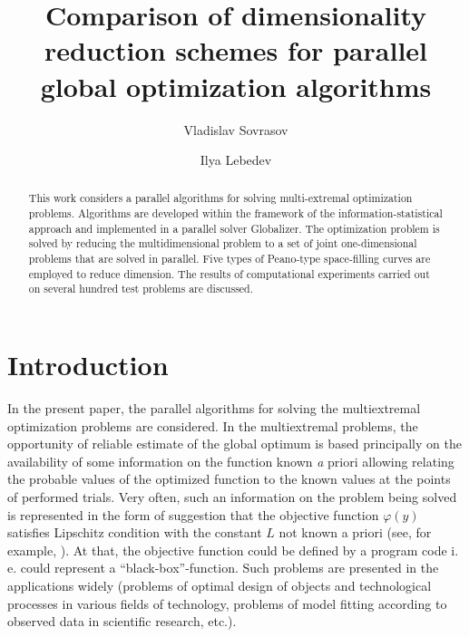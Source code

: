 \documentclass[procedia]{easychair}
\title{Comparison of dimensionality reduction schemes for parallel global optimization
algorithms}
\author {
Vladislav Sovrasov \and
Ilya Lebedev
}
\institute  {
  Lobachevsky State University of Nizhni Novgorod, Nizhni Novgorod, Russia
  \email{sovrasov.vlad@gmail.com}\\
  \email{ilya.lebedev@itmm.unn.ru}\\
}
\begin{document}
\maketitle


\begin{abstract}
This work considers a parallel algorithms for solving multi-extremal optimization problems.
Algorithms are developed within the framework of the information-statistical approach and
implemented in a parallel solver Globalizer. The optimization problem is solved by reducing
the multidimensional problem to a set of joint one-dimensional problems that are solved in
parallel. Five types of Peano-type space-filling curves are employed to reduce dimension. The
results of computational experiments carried out on several hundred test problems are discussed.
\end{abstract}



%
%


\section{Introduction}
\label{sec:intro}

In the present paper, the parallel algorithms for solving the multiextremal optimization problems
are considered. In the multiextremal problems, the opportunity of reliable estimate of the global
optimum is based principally on the availability of some information on the function known
{\textit a priori} allowing relating the probable values of the optimized function to the known
values at the points of performed trials. Very often, such an information on the problem being
solved is represented in the form of suggestion that the objective function $\varphi(y)$ satisfies
Lipschitz condition with the constant $L$ not known a priori (see, for example,
\cite{Jones,Gablonsky,Evtushenko}). At that, the objective function could be defined by a
program code i. e. could represent a ``black-box''-function. Such problems are presented in the
applications widely (problems of optimal design of objects and technological processes in
various fields of technology, problems of model fitting according to observed data in scientific
research, etc.).
\end{document}
